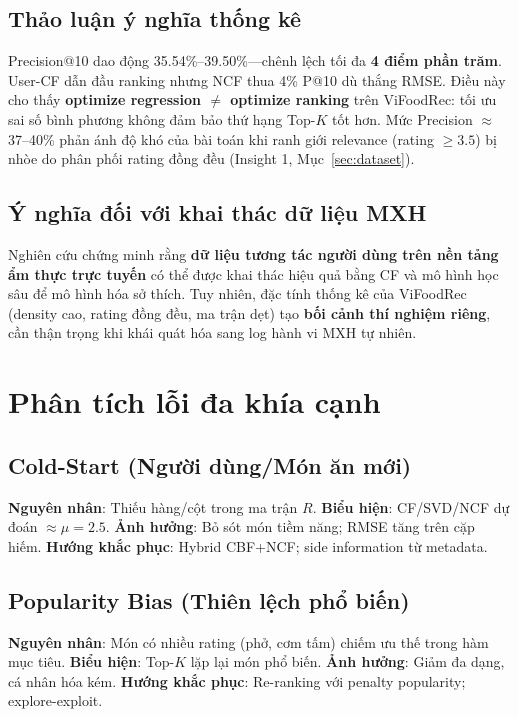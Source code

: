 \documentclass[11pt]{article}
\begin{document}
\subsection{Thảo luận ý nghĩa thống kê}
Precision@10 dao động 35.54\%--39.50\%---chênh lệch tối đa \textbf{4 điểm phần trăm}. User-CF dẫn đầu ranking nhưng NCF thua 4\% P@10 dù thắng RMSE. Điều này cho thấy \textbf{optimize regression $\neq$ optimize ranking} trên ViFoodRec: tối ưu sai số bình phương không đảm bảo thứ hạng Top-$K$ tốt hơn. Mức Precision $\approx$37--40\% phản ánh độ khó của bài toán khi ranh giới relevance (rating $\geq 3.5$) bị nhòe do phân phối rating đồng đều (Insight 1, Mục~\ref{sec:dataset}).

\subsection{Ý nghĩa đối với khai thác dữ liệu MXH}
Nghiên cứu chứng minh rằng \textbf{dữ liệu tương tác người dùng trên nền tảng ẩm thực trực tuyến} có thể được khai thác hiệu quả bằng CF và mô hình học sâu để mô hình hóa sở thích. Tuy nhiên, đặc tính thống kê của ViFoodRec (density cao, rating đồng đều, ma trận dẹt) tạo \textbf{bối cảnh thí nghiệm riêng}, cần thận trọng khi khái quát hóa sang log hành vi MXH tự nhiên.

\section{Phân tích lỗi đa khía cạnh}
\label{sec:error}

\subsection{Cold-Start (Người dùng/Món ăn mới)}
\textbf{Nguyên nhân}: Thiếu hàng/cột trong ma trận $R$. \textbf{Biểu hiện}: CF/SVD/NCF dự đoán $\approx \mu=2.5$. \textbf{Ảnh hưởng}: Bỏ sót món tiềm năng; RMSE tăng trên cặp hiếm. \textbf{Hướng khắc phục}: Hybrid CBF+NCF; side information từ metadata.

\subsection{Popularity Bias (Thiên lệch phổ biến)}
\textbf{Nguyên nhân}: Món có nhiều rating (phở, cơm tấm) chiếm ưu thế trong hàm mục tiêu. \textbf{Biểu hiện}: Top-$K$ lặp lại món phổ biến. \textbf{Ảnh hưởng}: Giảm đa dạng, cá nhân hóa kém. \textbf{Hướng khắc phục}: Re-ranking với penalty popularity; explore-exploit.
\end{document}

